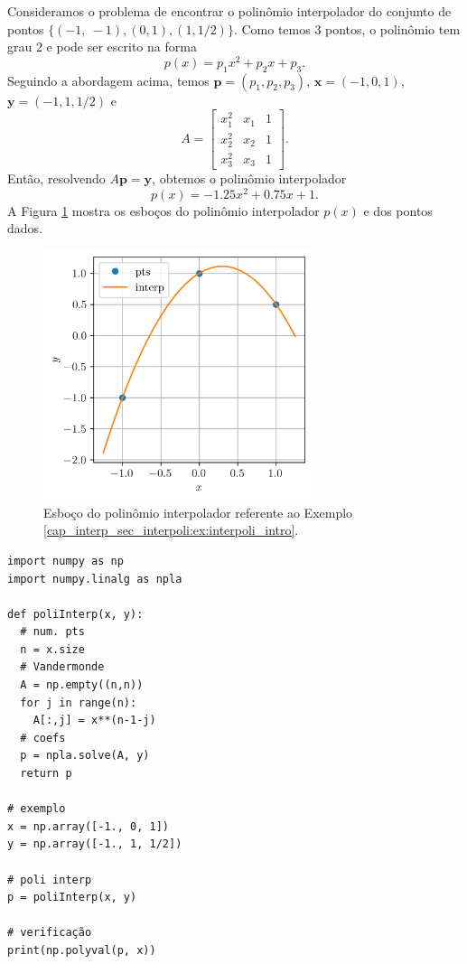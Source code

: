\begin{ex}\label{cap_interp_sec_interpoli:ex:interpoli_intro}
  Consideramos o problema de encontrar o polinômio interpolador do conjunto de pontos $\{(-1,~-1), (0, 1), (1, 1/2)\}$. Como temos 3 pontos, o polinômio tem grau 2 e pode ser escrito na forma
  \begin{equation}
    p(x) = p_1x^2 + p_2x + p_3.
  \end{equation}
  Seguindo a abordagem acima, temos $\pmb{p}=(p_1, p_2, p_3)$, $\pmb{x} = (-1, 0, 1)$, $\pmb{y}=(-1, 1, 1/2)$ e
  \begin{equation}
    A =
    \begin{bmatrix}
      x_1^2 & x_1 & 1\\
      x_2^2 & x_2 & 1\\
      x_3^2 & x_3 & 1
    \end{bmatrix}.
  \end{equation}
  Então, resolvendo $A\pmb{p} = \pmb{y}$, obtemos o polinômio interpolador
  \begin{equation}
    p(x) = -1.25x^2 + 0.75x + 1.
  \end{equation}
A Figura \ref{cap_interp_sec_interpoli:fig:interpoli_intro} mostra os esboços do polinômio interpolador $p(x)$ e  dos pontos dados.

\begin{figure}[H]
  \centering
  \includegraphics[width=0.7\textwidth]{./cap_interp/dados/fig_poliInterp/fig}
  \caption{Esboço do polinômio interpolador referente ao Exemplo \ref{cap_interp_sec_interpoli:ex:interpoli_intro}.}
  \label{cap_interp_sec_interpoli:fig:interpoli_intro}
\end{figure}

\begin{lstlisting}[caption=poliInterp.py]
import numpy as np
import numpy.linalg as npla

def poliInterp(x, y):
  # num. pts
  n = x.size
  # Vandermonde
  A = np.empty((n,n))
  for j in range(n):
    A[:,j] = x**(n-1-j)
  # coefs
  p = npla.solve(A, y)
  return p

# exemplo
x = np.array([-1., 0, 1])
y = np.array([-1., 1, 1/2])

# poli interp
p = poliInterp(x, y)

# verificação
print(np.polyval(p, x))
\end{lstlisting}

\end{ex}

